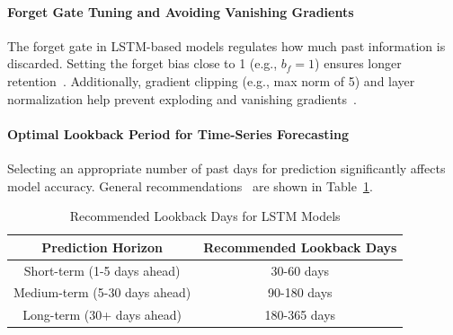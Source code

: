 \paragraph{Forget Gate Tuning and Avoiding Vanishing Gradients}
The forget gate in LSTM-based models regulates how much past information is discarded. Setting the 
forget bias close to 1 (e.g., $ b_f = 1 $) ensures longer 
retention~\parencite{balasubramanian2023SystematicSurvey}. Additionally, gradient 
clipping (e.g., max norm of 5) and layer normalization help prevent exploding and vanishing 
gradients~\parencite{chang2024StockPrediction}.

\paragraph{Optimal Lookback Period for Time-Series Forecasting} Selecting an appropriate number
of past days for prediction significantly affects model accuracy. General 
recommendations~\parencite{shaban2024SMPDL, phuoc2024StockPrediction} are shown in Table~\ref{table:lookback}.

\begin{table}[H]
\centering
\caption{Recommended Lookback Days for LSTM Models}
\label{table:lookback}
\begin{tabular}{cc}
\hline
\textbf{Prediction Horizon} & \textbf{Recommended Lookback Days} \\ \hline\hline
Short-term (1-5 days ahead) & 30-60 days \\
Medium-term (5-30 days ahead) & 90-180 days \\
Long-term (30+ days ahead) & 180-365 days \\\hline
\end{tabular}
\end{table}











